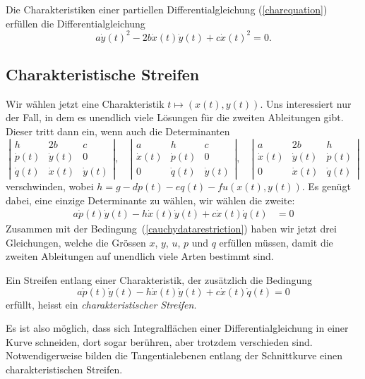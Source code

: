 \begin{satz}
\label{charakteristikendgl}
Die Charakteristiken einer partiellen Differentialgleichung (\ref{charequation})
erfüllen  die Differentialgleichung
\[
a\dot y(t)^2-2b\dot x(t)\dot y(t)+c\dot x(t)^2=0.
\]
\end{satz}

\subsection{Charakteristische Streifen}
Wir wählen jetzt eine Charakteristik $t\mapsto(x(t),y(t))$.
Uns interessiert nur der Fall, in dem es unendlich viele
Lösungen für die zweiten Ableitungen gibt. Dieser tritt dann
ein, wenn auch die Determinanten
\[
\left|
\begin{matrix}
h&2b&c\\
\dot p(t)&\dot y(t)&0\\
\dot q(t)&\dot x(t)&\dot y(t)
\end{matrix}
\right|
,
\quad
\left|
\begin{matrix}
a&h&c\\
\dot x(t)&\dot p(t)&0\\
0&\dot q(t)&\dot y(t)
\end{matrix}
\right|
,
\quad
\left|
\begin{matrix}
a&2b&h\\
\dot x(t)&\dot y(t)&\dot p(t)\\
0&\dot x(t)&\dot q(t)
\end{matrix}
\right|
\]
verschwinden, wobei $h=g-dp(t)-eq(t)-fu(x(t),y(t))$.
Es genügt dabei, eine einzige Determinante zu wählen,
wir wählen die zweite:
\begin{align*}
a\dot p(t)\dot y(t)-h\dot x(t)\dot y(t)+c\dot x(t)\dot q(t)&=0
\end{align*}
Zusammen mit der Bedingung~(\ref{cauchydatarestriction})
haben wir jetzt drei Gleichungen, welche die Grössen 
$x$, $y$, $u$, $p$ und $q$ erfüllen müssen, damit die zweiten
Ableitungen auf unendlich viele Arten bestimmt sind.

\begin{definition}
Ein Streifen entlang einer Charakteristik, der zusätzlich die
Bedingung 
\[
a\dot p(t)\dot y(t)-h\dot x(t)\dot y(t)+c\dot x(t)\dot q(t)=0
\]
erfüllt, heisst ein {\em charakteristischer Streifen}.
\end{definition}

Es ist also möglich, dass sich Integralflächen einer Differentialgleichung
in einer Kurve schneiden, dort sogar berühren, aber trotzdem verschieden
sind. Notwendigerweise bilden die Tangentialebenen
entlang der Schnittkurve einen charakteristischen Streifen.

